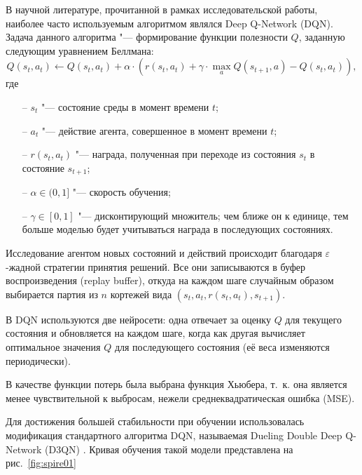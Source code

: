 В научной литературе, прочитанной в рамках исследовательской работы, наиболее часто используемым алгоритмом являлся Deep Q-Network (DQN). Задача данного алгоритма "--- формирование функции полезности \(Q\), заданную следующим уравнением Беллмана: \[Q(s_t, a_t) \leftarrow Q(s_t, a_t) + \alpha \cdot (r(s_t, a_t) + \gamma \cdot \max_a Q(s_{t+1}, a) - Q(s_t, a_t)),\] где 
\begin{itemize}
	\item[--] \(s_t\) "--- состояние среды в момент времени \(t\); 
	\item[--]  \(a_t\) "--- действие агента, совершенное в момент времени \(t\);
	\item[--] \(r(s_t, a_t)\) "--- награда, полученная при переходе из состояния \(s_t\) в состояние \(s_{t+1}\);
	\item[--] \(\alpha \in (0, 1]\) "--- скорость обучения;
	\item[--] \(\gamma \in [0, 1]\) "--- дисконтирующий множитель; чем ближе он к единице, тем больше моделью будет учитываться награда в последующих состояниях.
\end{itemize}

Исследование агентом новых состояний и действий происходит благодаря $\varepsilon$-жадной стратегии принятия решений. Все они записываются в буфер воспроизведения (replay buffer), откуда на каждом шаге случайным образом выбирается партия из \(n\) кортежей вида \((s_t, a_t, r(s_t, a_t), s_{t+1})\).

В DQN используются две нейросети: одна отвечает за оценку \(Q\) для текущего состояния и обновляется на каждом шаге, когда как другая вычисляет оптимальное значения \(Q\) для последующего состояния (её веса изменяются периодически).

В качестве функции потерь была выбрана функция Хьюбера, т.~к. она является менее чувствительной к выбросам, нежели среднеквадратическая ошибка (MSE).

Для достижения большей стабильности при обучении использовалась модификация стандартного алгоритма DQN, называемая Dueling Double Deep Q-Network (D3QN) \cite{wang2016dueling,hasselt2016deep}. Кривая обучения такой модели представлена на рис.~\ref{fig:spire01}

